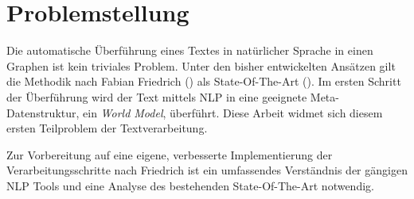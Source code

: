 \section{Problemstellung}

Die automatische Überführung eines Textes in natürlicher Sprache in einen Graphen ist kein triviales Problem. Unter den bisher entwickelten Ansätzen gilt die Methodik nach Fabian Friedrich (\cite[vgl.][]{FRIEDRICH1}) als State-Of-The-Art (\cite[vgl.][]{RIEFER}). Im ersten Schritt der Überführung wird der Text mittels \ac{NLP} in eine geeignete Meta-Datenstruktur, ein \textit{World Model}, überführt. Diese Arbeit widmet sich diesem ersten Teilproblem der Textverarbeitung.
\par
Zur Vorbereitung auf eine eigene, verbesserte Implementierung der Verarbeitungsschritte nach Friedrich ist ein umfassendes Verständnis der gängigen \ac{NLP} Tools und eine Analyse des bestehenden State-Of-The-Art notwendig.



 